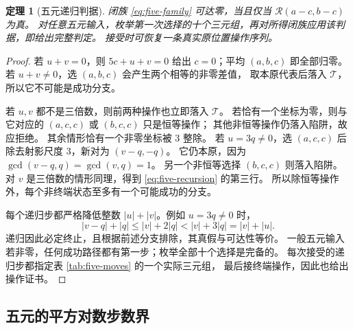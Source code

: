 \documentclass[UTF8,fontset=fandol,zihao=-4,a4paper]{ctexart}
\numberwithin{equation}{section}
\newtheorem{theorem}{定理}[section]
\theoremstyle{definition}
\begin{document}
\begin{theorem}[五元递归判据]\label{thm:five}
闭族 \eqref{eq:five-family} 可达零，当且仅当 $\mathscr R(a-c,b-c)$ 为真。
对任意五元输入，枚举第一次选择的十个三元组，再对所得闭族应用该判据，即给出完整判定。
接受时可恢复一条真实原位置操作序列。
\end{theorem}
\begin{proof}
若 $u+v=0$，则 $5c+u+v=0$ 给出 $c=0$；平均 $(a,b,c)$ 即全部归零。
若 $u+v\ne0$，选 $(a,b,c)$ 会产生两个相等的非零差值，
取本原代表后落入 $\mathcal T$，所以它不可能是成功分支。

若 $u,v$ 都不是三倍数，则前两种操作也立即落入 $\mathcal T$。
若恰有一个坐标为零，则与它对应的 $(a,c,c)$ 或 $(b,c,c)$ 只是恒等操作；
其他非恒等操作仍落入陷阱，故应拒绝。
其余情形恰有一个非零坐标被 $3$ 整除。
若 $u=3q\ne0$，选 $(a,c,c)$ 后除去射影尺度 $3$，新对为 $(v-q,-q)$。
它仍本原，因为 $\gcd(v-q,q)=\gcd(v,q)=1$。
另一个非恒等选择 $(b,c,c)$ 则落入陷阱。
对 $v$ 是三倍数的情形同理，得到 \eqref{eq:five-recursion} 的第三行。
所以除恒等操作外，每个非终端状态至多有一个可能成功的分支。

每个递归步都严格降低整数 $|u|+|v|$。例如 $u=3q\ne0$ 时，
\begin{equation}\label{eq:five-l1}
 |v-q|+|q|\le |v|+2|q|<|v|+3|q|=|v|+|u|.
\end{equation}
递归因此必定终止，且根据前述分支排除，其真假与可达性等价。
一般五元输入若非零，任何成功路径都有第一步；枚举全部十个选择是完备的。
每次接受的递归步都指定表 \ref{tab:five-moves} 的一个实际三元组，
最后接终端操作，因此也给出操作证书。
\end{proof}

\subsection{五元的平方对数步数界}
\end{document}
